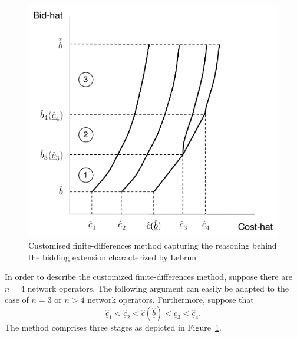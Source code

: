 \begin{figure}[t]
  \includegraphics[width=\figsize]{Indirect/Figures/lebrun_solution}
  \caption{Customised finite-differences method capturing the reasoning behind the bidding extension characterized by Lebrun~\cite{Lebrun2006}}
  \label{fig:lebrun_solution_indirect}
\end{figure}

In order to describe the customized finite-differences method, suppose there are $n=4$ network operators. The following argument can easily be adapted to the case of $n=3$ or $n>4$ network operators. Furthermore, suppose that
\begin{equation*}
  \underline{\hat{c}}_1 < \underline{\hat{c}}_2 < \hat{c}(\underline{\hat{b}}) < \underline{\hat{c}}_3 < \underline{\hat{c}}_4.
\end{equation*}
The method comprises three stages as depicted in Figure~\ref{fig:lebrun_solution_indirect}.

